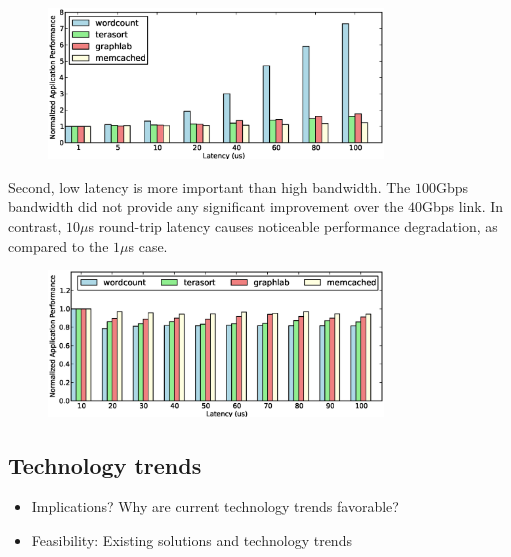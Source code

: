%
\begin{figure}
  \centering
    \includegraphics[width = 3.5in]{img/graph9_fix_bw_vary_latency.eps} 
  \caption{\small{}}
  \label{fig:impl}
\end{figure}
%
Second, low latency is more important than high bandwidth. The $100$Gbps bandwidth did not provide any significant improvement over the $40$Gbps link. In contrast, $10\mu$s round-trip latency causes noticeable performance degradation, as compared to the $1\mu$s case.

%
\begin{figure}
  \centering
    \includegraphics[width = 3.5in]{img/graph10_fix_latency_vary_bw.eps} 
  \caption{\small{}}
  \label{fig:impb}
\end{figure}
%


\subsection{Technology trends}
\label{ssec:rtt}

\begin{itemize}
	\item Implications? Why are current technology trends favorable?
	\item Feasibility: Existing solutions and technology trends
\end{itemize}